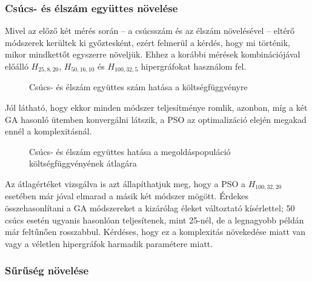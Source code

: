 \subsubsection{Csúcs- és élszám együttes növelése}

Mivel az előző két mérés során -- a csúcsszám és az élszám növelésével -- eltérő módszerek kerültek ki győztesként, ezért felmerül a kérdés, hogy mi történik, mikor mindkettőt egyszerre növeljük. Ehhez a korábbi mérések kombinációjával előálló $H_{25,8,20}$, $H_{50,16,10}$ és $H_{100,32,5}$ hipergráfokat használom fel.

\begin{figure}[H]
	\centering
	\hspace{5pt}
	\hspace{5pt}
	\caption{Csúcs- és élszám együttes szám hatása a költségfüggvényre}
\end{figure}

Jól látható, hogy ekkor minden módszer teljesítménye romlik, azonban, míg a két GA hasonló ütemben konvergálni látszik, a PSO az optimalizáció elején megakad ennél a komplexitásnál.

\begin{figure}[H]
	\centering
	\hspace{5pt}
	\hspace{5pt}
	\caption{Csúcs- és élszám együttes hatása a megoldáspopuláció költségfüggvényének átlagára}
\end{figure}

Az átlagértéket vizsgálva is azt állapíthatjuk meg, hogy a PSO a $H_{100,32,20}$ esetében már jóval elmarad a másik két módszer mögött. Érdekes összehasonlítani a GA módszereket a kizárólag éleket változtató kísérlettel; 50 csúcs esetén ugyanis hasonlóan teljesítenek, mint 25-nél, de a legnagyobb példán már feltűnően rosszabbul. Kérdéses, hogy ez a komplexitás növekedése miatt van vagy a véletlen hipergráfok harmadik paramétere miatt. 

\subsubsection{Sűrűség növelése}

